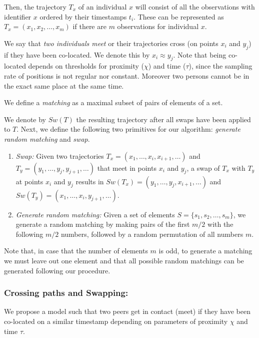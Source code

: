 Then, the trajectory $T_x$ of an individual \texttt{$x$} will consist of all the observations with identifier \texttt{$x$} ordered by their timestamps \texttt{$t_i$}.
These can be represented as $T_x = (x_1, x_2, \ldots, x_m)$ if there are $m$ observations for individual $x$.


We say that \emph{two individuals meet} or their trajectories cross (on points $x_i$ and $y_j$) if they have been co-located. We denote this by $x_i \approx y_j$. Note that being co-located depends on thresholds for proximity ($\chi$) and time ($\tau$), since the sampling rate of positions is not regular nor constant. Moreover two persons cannot be in the exact same place at the same time.

We define a \emph{matching} as a maximal subset of pairs of elements of a set.

We denote by $Sw(T)$ the resulting trajectory after all swaps have been applied to $T$.
Next, we define the following two primitives for our algorithm: \emph{generate random matching} and \emph{swap}.
\begin{enumerate}

\item \emph{Swap:}
Given two trajectories $T_x = (x_1, \ldots, x_i, x_{i+1}, \ldots)$ and \linebreak
$T_y= (y_1, \ldots, y_j, y_{j+1}, \ldots)$ that meet in points $x_i$ and $y_j$, a swap of $T_x$ with $T_y$ at points $x_i$ and $y_j$ results in $Sw(T_x) = (y_1, \ldots, y_j, x_{i+1}, \ldots)$ and
\linebreak
$Sw(T_y)= (x_1, \ldots, x_i, y_{j+1}, \ldots)$.
\item \emph{Generate random matching:}
Given a set of elements $S = \{s_1, s_2,\ldots, s_m\}$, we generate a random matching by making pairs of the first $m/2$ with the following $m/2$ numbers, followed by a random permutation of all numbers $m$.
\end{enumerate}

Note that, in case that the number of elements $m$ is odd, to generate a matching we must leave out one element and that all possible random matchings can be generated following our procedure.

\subsubsection{Crossing paths and Swapping:} \label{sec:cross}
We propose a model such that two peers get in contact (meet) if they have been co-located on a similar timestamp depending on parameters of proximity $\chi$ and time $\tau$.


